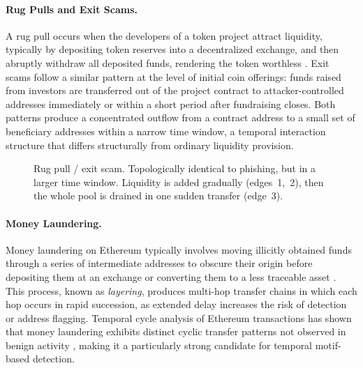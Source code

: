 \documentclass{thesisclass}
\begin{document}
\paragraph{Rug Pulls and Exit Scams.}
A rug pull occurs when the developers of a token project attract liquidity, typically by depositing token reserves into a decentralized exchange, and then abruptly withdraw all deposited funds, rendering the token worthless \citep{hornuf2025cybercrime, xia2021rugpull}. Exit scams follow a similar pattern at the level of initial coin offerings: funds raised from investors are transferred out of the project contract to attacker-controlled addresses immediately or within a short period after fundraising closes. Both patterns produce a concentrated outflow from a contract address to a small set of beneficiary addresses within a narrow time window, a temporal interaction structure that differs structurally from ordinary liquidity provision.

\begin{figure}[ht]
  \centering
  \caption[Rug pull temporal motif]{Rug pull / exit scam. Topologically identical
    to phishing, but in a larger time window. Liquidity is added gradually (edges~1,~2),
    then the whole pool is drained in one sudden transfer (edge~3).}
  \label{fig:motif-rugpull}
\end{figure}

\paragraph{Money Laundering.}
Money laundering on Ethereum typically involves moving illicitly obtained funds through a series of intermediate addresses to obscure their origin before depositing them at an exchange or converting them to a less traceable asset \citep{lal2021money}. This process, known as \emph{layering}, produces multi-hop transfer chains in which each hop occurs in rapid succession, as extended delay increases the risk of detection or address flagging. Temporal cycle analysis of Ethereum transactions has shown that money laundering exhibits distinct cyclic transfer patterns not observed in benign activity \citep{lal2021money}, making it a particularly strong candidate for temporal motif-based detection.
\end{document}
